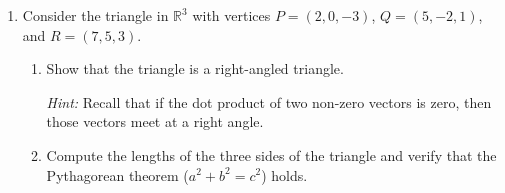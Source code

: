 \documentclass[12pt]{article}
\newcommand{\points}[1]{\marginpar{\hspace{24pt}[#1]}}
\newcommand{\R}{\mathbb{R}}
\begin{document}
\begin{enumerate}
\newpage

\item Consider the triangle in $\R^3$ with vertices $P=(2,0,-3)$, $Q=(5,-2,1)$, and $R=(7,5,3)$.
\begin{enumerate}
 \item Show that the triangle is a right-angled triangle. \points{3}

{\em Hint:} Recall that if the dot product of two non-zero vectors is zero, then those vectors meet at a right angle.

\vspace{4in}

 \item Compute the lengths of the three sides of the triangle and verify that the Pythagorean theorem ($a^2+b^2=c^2$) holds. \points{2}

 


\end{enumerate}
 
\end{enumerate}
\end{document}
